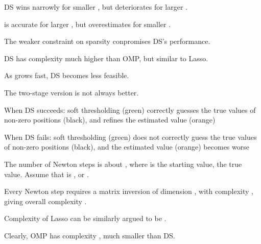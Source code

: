 {
\blank [big]
}
{
\blank [big]
}
{
\blank [big]
}
{
\blank [big]
}
{
\I DS wins narrowly for smaller \m {\s}, but deteriorates for larger \m {\s}.

\I {} is accurate for larger \m {\s}, but overestimates for smaller \m {\s}.

\I The weaker constraint on sparsity conpromises DS's performance.

\I DS has complexity much higher than OMP, but similar to Lasso.

\I As  grows fast, DS becomes less feasible.

\I The two-stage version is not always better.
}
{
\blank [big]

\I When DS succeeds: soft thresholding (green) correctly guesses the true values of non-zero positions (black), and refines the estimated value (orange)
}
{
\blank [big]

\I When DS fails: soft thresholding (green) does not correctly guess the true values of non-zero positions (black), and the estimated value (orange) becomes worse
}
{
\I The number of Newton steps is about , where  is the starting value,  the true value.
Assume that is , or .

\I Every Newton step requires a matrix inversion of dimension , with complexity , giving overall complexity .

\I Complexity of Lasso can be similarly argued to be .

\I Clearly, OMP has complexity , much smaller than DS.
}


